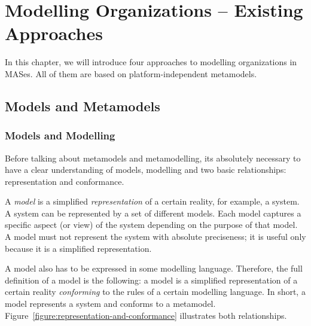 
\chapter{Modelling Organizations -- Existing Approaches}

In this chapter, we will introduce four approaches to modelling organizations in MASes.
All of them are based on platform-independent metamodels.

\section{Models and Metamodels}

\subsection*{Models and Modelling}

Before talking about metamodels and metamodelling, its absolutely necessary to have a clear understanding of models, modelling and two basic relationships: representation and conformance. 

A \textit{model} is a simplified \textit{representation} of a certain reality, for example, a system.
A system can be represented by a set of different models.
Each model captures a specific aspect (or view) of the system depending on the purpose of that model.
A model must not represent the system with absolute preciseness; it is useful only because it is a simplified representation.

A model also has to be expressed in some modelling language.
Therefore, the full definition of a model is the following: a model is a simplified representation of a certain reality \textit{conforming} to the rules of a certain modelling language. In short, a model represents a system and conforms to a metamodel. Figure~\ref{figure:representation-and-conformance} illustrates both relationships.

